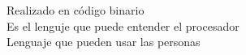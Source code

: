 \documentclass[preview]{standalone}
\begin{document}
Realizado en código binario\\Es el lenguje que puede entender el procesador\\Lenguaje que pueden usar las personas\\
\end{document}

